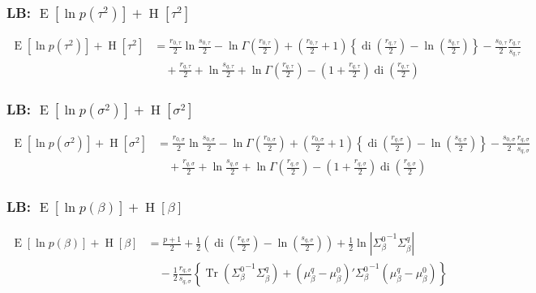 \documentclass[11pt]{article}
\DeclareMathOperator{\Tr}{Tr}
\newcommand{\opn}{\operatorname}
\begin{document}
\subsubsection{LB: $\opn{E}\left[\ln p\left(\tau^{2}\right)\right]+\opn{H}\left[\tau^{2}\right]$}
\begin{align*}
  \opn{E}\left[\ln p\left(\tau^{2}\right)\right]+\opn{H}\left[\tau^{2}\right] &= \frac{r_{0,\tau}}{2}\ln \frac{s_{0,\tau}}{2} -\ln\Gamma\left(\frac{r_{0,\tau}}{2}\right) +\left(\frac{r_{0,\tau}}{2}+1\right)\left\{\opn{di}\left(\frac{r_{q,\tau}}{2}\right)-\ln\left(\frac{s_{q,\tau}}{2}\right) \right\} -\frac{s_{0,\tau}}{2}\frac{r_{q,\tau}}{s_{q,\tau}}\\
  &\quad +\frac{r_{q,\tau}}{2} +\ln\frac{s_{q,\tau}}{2} +\ln\Gamma\left(\frac{r_{q,\tau}}{2}\right) -\left(1+\frac{r_{q,\tau}}{2}\right)\opn{di}\left(\frac{r_{q,\tau}}{2}\right)
\end{align*}
\subsubsection{LB: $\opn{E}\left[\ln p\left(\sigma^{2}\right)\right]+\opn{H}\left[\sigma^{2}\right]$}
\begin{align*}
  \opn{E}\left[\ln p\left(\sigma^{2}\right)\right]+\opn{H}\left[\sigma^{2}\right] &= \frac{r_{0,\sigma}}{2}\ln \frac{s_{0,\sigma}}{2} -\ln\Gamma\left(\frac{r_{0,\sigma}}{2}\right) +\left(\frac{r_{0,\sigma}}{2}+1\right)\left\{\opn{di}\left(\frac{r_{q,\sigma}}{2}\right)-\ln\left(\frac{s_{q,\sigma}}{2}\right) \right\} -\frac{s_{0,\sigma}}{2}\frac{r_{q,\sigma}}{s_{q,\sigma}}\\
  &\quad +\frac{r_{q,\sigma}}{2} +\ln\frac{s_{q,\sigma}}{2} +\ln\Gamma\left(\frac{r_{q,\sigma}}{2}\right) -\left(1+\frac{r_{q,\sigma}}{2}\right)\opn{di}\left(\frac{r_{q,\sigma}}{2}\right)
\end{align*}
\subsubsection{LB: $\opn{E}\left[\ln p\left(\beta\right)\right]+\opn{H}\left[\beta\right] $}
\begin{align*}
  \opn{E}\left[\ln p\left(\beta\right)\right]+\opn{H}\left[\beta\right] &= \frac{p+1}{2} +\frac{1}{2}\left(\opn{di}\left(\frac{r_{q,\sigma}}{2}\right)-\ln\left(\frac{s_{q,\sigma}}{2}\right)\right) +\frac{1}{2}\ln\left|{\Sigma_{\beta}^{0}}^{-1}\Sigma_{\beta}^{q}\right|\\
  &\quad -\frac{1}{2}\frac{r_{q,\sigma}}{s_{q,\sigma}}\left\{\Tr\left({\Sigma_{\beta}^{0}}^{-1}\Sigma_{\beta}^{q}\right)+\left(\mu_{\beta}^{q}-\mu_{\beta}^{0}\right)'{\Sigma_{\beta}^{0}}^{-1}\left(\mu_{\beta}^{q}-\mu_{\beta}^{0}\right) \right\}
\end{align*}
\end{document}

